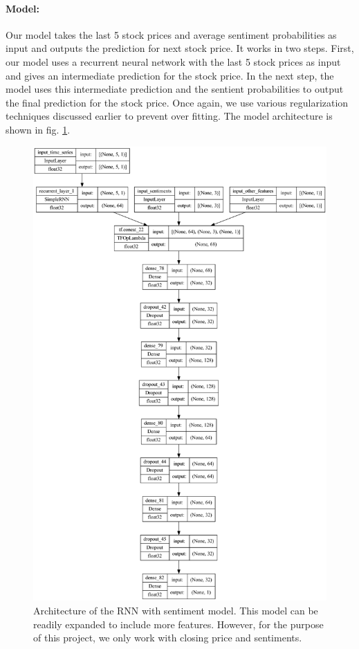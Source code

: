\documentclass[11pt]{article}
\begin{document}
\paragraph{Model:}{Our model takes the last 5 stock prices and average sentiment probabilities as input and outputs the prediction for next stock price. It works in two steps. First, our model uses a recurrent neural network with the last 5 stock prices as input and gives an intermediate prediction for the stock price. In the next step, the model uses this intermediate prediction and the sentient probabilities to output the final prediction for the stock price. Once again, we use various regularization techniques discussed earlier to prevent over fitting. The model architecture is shown in fig. \ref{fig_model}.}
\begin{figure}
	\centering
	\includegraphics[width = 0.75\linewidth]{graphics/model.png}
	\caption{Architecture of the RNN with sentiment model. This model can be readily expanded to include more features. However, for the purpose of this project, we only work with closing price and sentiments.}
	\label{fig_model}
\end{figure}
\end{document}
